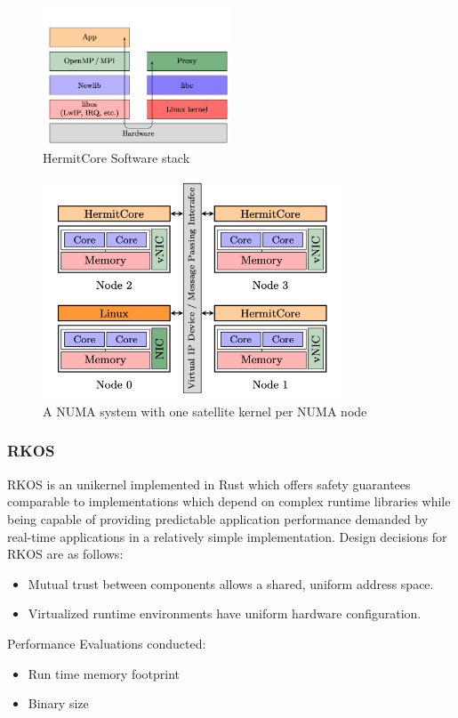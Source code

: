 \begin{figure}[htbp!] 
  \centering    
  \includegraphics[width=0.5\textwidth]{HermitCoreStack}
  \caption[HermitCore]{HermitCore Software stack}
  \label{fig:HermitCoreStack}
  \end{figure}

  \begin{figure}[htbp!] 
    \centering    
    \includegraphics[width=0.8\textwidth]{NumaHermitCore}
    \caption[HermitCore]{A NUMA system with one satellite kernel per NUMA node}
    \label{fig:HermitCoreStack}
    \end{figure}



\subsubsection{RKOS}
RKOS is an unikernel implemented in Rust which
offers safety guarantees comparable to implementations which depend on complex runtime
libraries while being capable of providing predictable application performance demanded
by real-time applications in a relatively simple implementation. 
Design decisions for RKOS are as follows:
\begin{itemize}
  \item Mutual trust between components allows a shared, uniform address space.
  \item Virtualized runtime environments have uniform hardware configuration.
\end{itemize}
Performance Evaluations conducted:
\begin{itemize}
  \item Run time memory footprint 
  \item Binary size 
\end{itemize}

